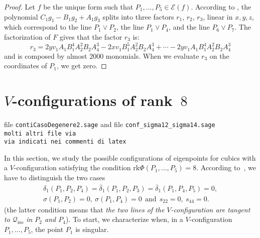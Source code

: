 \documentclass{amsart}
\theoremstyle{plain}
\theoremstyle{definition}
\newcommand{\iso}{\mathcal{Q}_{\mathrm{iso}}}
\newcommand{\Eig}[1]{\mathcal{E}\!\left( {#1} \right)}
\newcommand{\rk}{\ensuremath{\mathrm{rk}}}
\begin{document}
\begin{proof}
Let $f$ be the unique form such that $P_1, \dotsc, P_5 \in \Eig{f}$.
According to , the polynomial
$C_1g_1-B_1g_2+A_1g_3$ splits into three factors $r_1$, $r_2$, $r_3$,
linear in $x, y, z$, which
correspond to the line $P_1 \vee P_2$, the line $P_1 \vee P_4$, and the line $P_6 \vee P_7$.
The factorization of $F$ gives that the factor $r_3$ is:
\[
r_3 = 2yv_1A_1B_1^4A_2^2B_2A_4^3-2xv_1B_1^5A_2^2B_2A_4^3+\cdots
-2 yv_1A_1B_1^4A_2^2B_2A_4^3
\]
and is composed by almost $2000$ monomials. When we
evaluate $r_3$ on the coordinates of $P_1$, we get zero.
\end{proof}

\section{$V$-configurations of rank~$8$}
\label{rank_8}
file \verb+contiCasoDegenere2.sage+ and file
\verb+conf_sigma12_sigma14.sage+\\
\verb+molti altri file via +\\
\verb+via indicati nei commenti di latex+

In this section, we study the possible configurations of
eigenpoints for cubics with a $V$-configuration
satisfying the condition $\rk \Phi(P_1, \dots, P_5) = 8$. According
to~, we have to distinguish the two cases
%
\begin{gather}
\delta_1(P_1, P_2, P_4)=\overline{\delta}_1(P_1, P_2, P_3) =
\overline{\delta}_1(P_1, P_4, P_5) = 0,
\label{rk8_1}\\
\sigma(P_1, P_2) = 0, \  \sigma(P_1, P_4) = 0 \ \ \mbox{and} \ \ s_{22} = 0,
\  s_{44} = 0.
\label{rk8_2}
\end{gather}
%
(the latter condition means that \emph{the two lines of
the $V$-configuration are tangent to $\iso$ in $P_2$ and $P_4$}).
%
To start, we characterize when, in a $V$-configuration
$P_1, \dotsc, P_5$, the point $P_1$ is singular.
\end{document}
